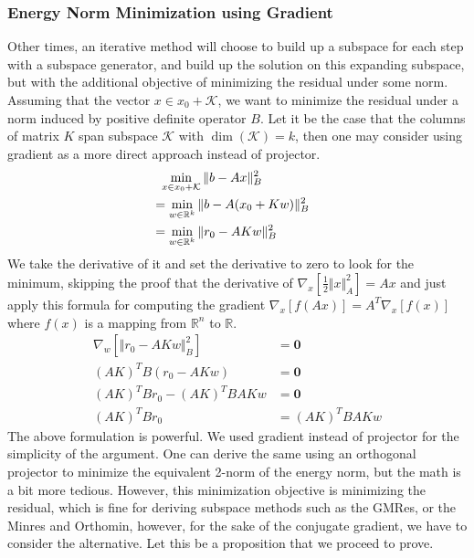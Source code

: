 \documentclass[]{article}
\theoremstyle{definition}
\begin{document}
        \subsubsection{Energy Norm Minimization using Gradient}\label{sec:Energy_Norm_Minimization_using_Gradient}
            Other times, an iterative method will choose to build up a subspace for each step with a subspace generator, and build up the solution on this expanding subspace, but with the additional objective of minimizing the residual under some norm. Assuming that the vector $x\in x_0 + \mathcal{K}$, we want to minimize the residual under a norm induced by positive definite operator $B$. Let it be the case that the columns of matrix $K$ span subspace $\mathcal{K}$ with $\dim(\mathcal K) = k$, then one may consider using gradient as a more direct approach instead of projector. 
            \begin{align}
                &\hspace{0.6em} \min_{x\in x_0 + \mathcal{K}} \Vert b - Ax\Vert_B^2 
                \\
                &= \min_{w\in \mathbb{R}^{k}} 
                \Vert b - A(x_0 + Kw)\Vert_B^2 & 
                \\
                &= \min_{w\in \mathbb{R}^{k}} 
                \Vert 
                    r_0 - AKw
                \Vert_B^2
            \end{align}
            We take the derivative of it and set the derivative to zero to look for the minimum, skipping the proof that the derivative of $\nabla_x[\frac{1}{2}\Vert x\Vert_A^2] = Ax$ and just apply this formula for computing the gradient $\nabla_x[f(Ax)] = A^T\nabla_x [f(x)]$ where $f(x)$ is a mapping from $\mathbb R^n$ to $\mathbb R$. 
            \begin{align}
                \nabla_w \left[
                    \Vert r_0 - AKw\Vert_B^2
                \right] &= \mathbf{0}
                \\
                (AK)^TB(r_0 - AKw) &= \mathbf{0}
                \\
                (AK)^TBr_0 - (AK)^TBAKw &= \mathbf{0}
                \\
                (AK)^TBr_0 &= (AK)^TBAKw
            \end{align}
            The above formulation is powerful. We used gradient instead of projector for the simplicity of the argument. One can derive the same using an orthogonal projector to minimize the equivalent 2-norm of the energy norm, but the math is a bit more tedious. However, this minimization objective is minimizing the residual, which is fine for deriving subspace methods such as the GMRes, or the Minres and Orthomin, however, for the sake of the conjugate gradient, we have to consider the alternative. Let this be a proposition that we proceed to prove. 
\end{document}

